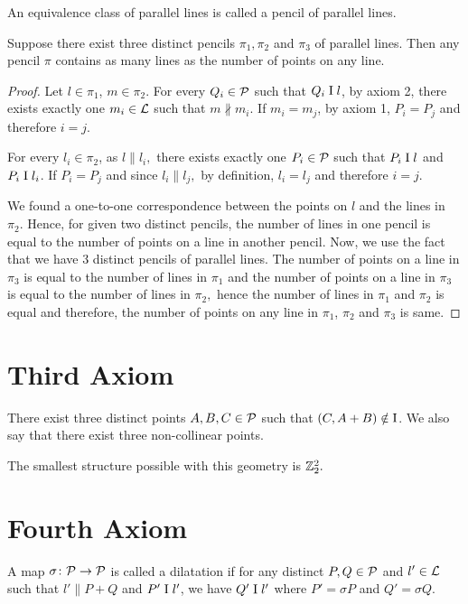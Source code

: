 \noindent
An equivalence class of parallel lines is called a pencil of parallel lines.

\begin{theorem} \label{thm:lines_num_pts}
    Suppose there exist three distinct pencils $\pi_1, \pi_2$ and $\pi_3$ of parallel lines. Then any pencil $\pi$ contains as many lines as the number of points on any line.
\end{theorem}
\begin{proof}
    Let $l \in \pi_1$, $m \in \pi_2.$ For every $Q_i \in \mathcal{P}$ such that $Q_i \mathrel\text{I} l$, by axiom 2, there exists exactly one $m_i \in \mathcal{L}$ such that $m \nparallel m_i.$ If $m_i = m_j$, by axiom 1, $P_i=P_j$ and therefore $i=j$.
    \vspace{1ex}

    \noindent
    For every $l_i \in \pi_2$, as $l \parallel l_i,$ there exists exactly one $P_i \in \mathcal{P}$ such that $P_i \mathrel\text{I} l$ and $P_i \mathrel\text{I} l_i$. If $P_i = P_j$ and since $l_i \parallel l_j,$ by definition, $l_i=l_j$ and therefore $i=j.$ 

    We found a one-to-one correspondence between the points on $l$ and the lines in $\pi_2.$ Hence, for given two distinct pencils, the number of lines in one pencil is equal to the number of points on a line in another pencil. Now, we use the fact that we have 3 distinct pencils of parallel lines. The number of points on a line in $\pi_3$ is equal to the number of lines in $\pi_1$ and the number of points on a line in $\pi_3$ is equal to the number of lines in $\pi_2,$ hence the number of lines in $\pi_1$ and $\pi_2$ is equal and therefore, the number of points on any line in $\pi_1$, $\pi_2$ and $\pi_3$ is same.
\end{proof}

\section{Third Axiom}
\begin{axiom}[3]
    There exist three distinct points $A,B,C \in \mathcal{P}$ such that $(C,A+B) \notin \text{I}$. We also say that there exist three non-collinear points.
\end{axiom}

\noindent
The smallest structure possible with this geometry is $\mathbb{Z}_2^2.$

\section{Fourth Axiom}
\begin{definition}
    A map $\sigma\colon \mathcal{P} \to \mathcal{P}$ is called a dilatation if for any distinct $P,Q \in \mathcal{P}$ and $l' \in \mathcal{L}$ such that $l' \parallel P+Q$ and $P' \mathrel\text{I} l'$, we have $Q' \mathrel\text{I} l'$ where $P'=\sigma P$ and $Q'=\sigma Q$.
\end{definition}

